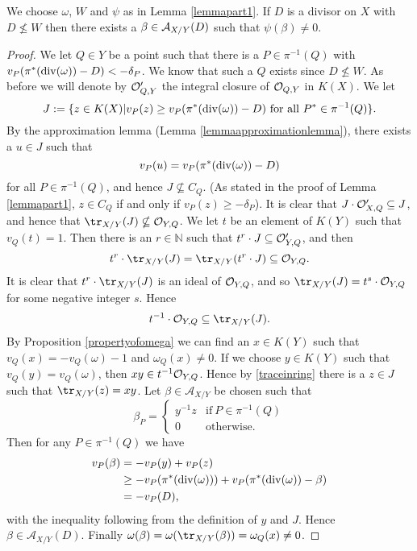     \begin{lem}\label{lemmapart2}
    We choose $\omega$, $W$ and $\psi$ as in Lemma \ref{lemmapart1}.
    If $D$ is a divisor on $X$ with $D \nleq W$ then there exists a $\beta \in {\mathcal A}_{X/Y}(D)$ such that $\psi(\beta) \neq 0$.
    \end{lem}
    \begin{proof}
    We let $Q\in Y$ be a point such that there is a $P\in \pi^{-1}(Q)$ with $v_{P}(\pi^*(\operatorname{div}(\omega)) - D) < -\delta_P$.
    We know that such a $Q$ exists since $D \nleq W$.
    As before we will denote by ${\cal O}_{Q,Y}'$ the integral closure of ${\cal O}_{Q,Y}$ in $K(X)$.
    We let 
        \[
        J := \{ z\in K(X) | v_{P}(z) \geq v_{P}(\pi^*(\operatorname{div} (\omega)) - D)\ \text{for all}\ P^*\in \pi^{-1}(Q)\}.
        \]
    By the approximation lemma (Lemma \ref{lemmaapproximationlemma}), there exists a $u\in J$ such that 
        \[
        v_{P}(u) = v_{P}(\pi^*(\operatorname{div} (\omega))-D)
        \]
    for all $P\in \pi^{-1}(Q)$, and hence $J\nsubseteq C_{Q}$.
    (As stated in the proof of Lemma \ref{lemmapart1}, $z\in C_Q$ if and only if $v_P(z) \geq -\delta_P$).
    It is clear that $J\cdot {\cal O}_{X,Q}' \subseteq J$, and hence that $\tr_{X/Y}(J) \nsubseteq \cO_{Y,Q}$.
    We let $t$ be an element of $K(Y)$ such that $v_Q(t) = 1$.
    Then there is an $r\in \mathbb N$ such that $t^r\cdot J \subseteq {\cal O}_{Y,Q}'$, and then 
        \[ 
        t^r\cdot \tr_{X/Y}(J) = \tr_{X/Y}(t^r\cdot J) \subseteq \cO_{Y,Q}.
        \]
    It is clear that $t^r\cdot \tr_{X/Y} (J)$ is an ideal of ${\cal O}_{Y,Q}$, and so $\tr_{X/Y}(J) = t^s\cdot \cO_{Y,Q}$ for some negative integer $s$.
    Hence 
        \begin{equation}\label{traceinring}
        t^{-1}\cdot \cO_{Y,Q} \subseteq \tr_{X/Y}(J).
        \end{equation}
    By Proposition \ref{propertyofomega} we can find an $x\in K(Y)$ such that $v_Q(x) = -v_Q(\omega) - 1$ and $\omega_Q(x) \neq 0$.
    If we choose $y\in K(Y)$ such that $v_Q(y) = v_Q(\omega)$, then $xy \in t^{-1}{\cal O}_{Y,Q}$.
    Hence by \eqref{traceinring} there is a $z\in J$ such that $\tr_{X/Y} (z) = xy$.
    Let $\beta \in \mathcal{A}_{X/Y}$ be chosen  such that 
        \begin{equation*}
        \beta_P =
            \begin{cases}
            y^{-1}z & \text{if}\ P\in \pi^{-1}(Q) \\
            0 & \text{otherwise}.
            \end{cases}
        \end{equation*}
    Then for any $P\in \pi^{-1}(Q)$ we have
        \begin{align*}
        v_P(\beta) & =  -v_P(y) + v_P(z) \\
        & \geq  -v_P(\pi^*(\operatorname{div} (\omega))) + v_P(\pi^*(\operatorname{div} (\omega)) - \beta) \\
        & =  -v_P(D),
        \end{align*}
    with the inequality following from the definition of $y$ and $J$.
    Hence $\beta \in \mathcal{A}_{X/Y}(D)$.
    Finally $\omega(\beta) = \omega(\tr_{X/Y}(\beta)) = \omega_Q(x) \neq 0$.
    \end{proof}



